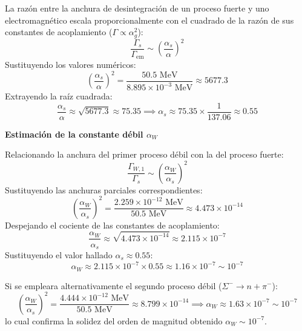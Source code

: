 \begin{problema}
La razón entre la anchura de desintegración de un proceso fuerte y uno electromagnético escala proporcionalmente con el cuadrado de la razón de sus constantes de acoplamiento ($\Gamma \propto \alpha_g^2$):
\begin{equation*}
    \frac{\Gamma_s}{\Gamma_{\text{em}}} \sim \left( \frac{\alpha_s}{\alpha} \right)^2
\end{equation*}
Sustituyendo los valores numéricos:
\begin{equation*}
    \left( \frac{\alpha_s}{\alpha} \right)^2 = \frac{50.5 \text{ MeV}}{8.895 \times 10^{-3} \text{ MeV}} \approx 5677.3
\end{equation*}
Extrayendo la raíz cuadrada:
\begin{equation*}
    \frac{\alpha_s}{\alpha} \approx \sqrt{5677.3} \approx 75.35 \implies \alpha_s \approx 75.35 \times \frac{1}{137.06} \approx 0.55
\end{equation*}

\textbf{Estimación de la constante débil $\alpha_W$}

Relacionando la anchura del primer proceso débil con la del proceso fuerte:
\begin{equation*}
    \frac{\Gamma_{W,1}}{\Gamma_s} \sim \left( \frac{\alpha_W}{\alpha_s} \right)^2
\end{equation*}
Sustituyendo las anchuras parciales correspondientes:
\begin{equation*}
    \left( \frac{\alpha_W}{\alpha_s} \right)^2 = \frac{2.259 \times 10^{-12} \text{ MeV}}{50.5 \text{ MeV}} \approx 4.473 \times 10^{-14}
\end{equation*}
Despejando el cociente de las constantes de acoplamiento:
\begin{equation*}
    \frac{\alpha_W}{\alpha_s} \approx \sqrt{4.473 \times 10^{-14}} \approx 2.115 \times 10^{-7}
\end{equation*}
Sustituyendo el valor hallado $\alpha_s \approx 0.55$:
\begin{equation*}
    \alpha_W \approx 2.115 \times 10^{-7} \times 0.55 \approx 1.16 \times 10^{-7} \sim 10^{-7}
\end{equation*}

Si se empleara alternativamente el segundo proceso débil ($\Sigma^- \to n + \pi^-$):
\begin{equation*}
    \left( \frac{\alpha_W}{\alpha_s} \right)^2 = \frac{4.444 \times 10^{-12} \text{ MeV}}{50.5 \text{ MeV}} \approx 8.799 \times 10^{-14} \implies \alpha_W \approx 1.63 \times 10^{-7} \sim 10^{-7}
\end{equation*}
lo cual confirma la solidez del orden de magnitud obtenido $\alpha_W \sim 10^{-7}$.

\end{problema}

